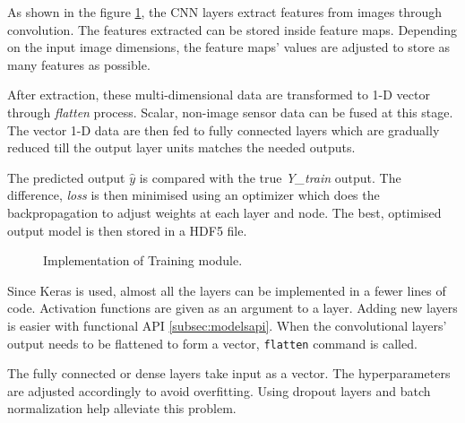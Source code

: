 As shown in the figure \ref{fig:trainingmodule}, the CNN layers extract features from
images through convolution. The features extracted can be stored inside feature maps. Depending on the input image dimensions, the
feature maps' values are adjusted to store as many features as possible.

After extraction, these multi-dimensional data are transformed to 1-D vector through
\textit{flatten} process. Scalar, non-image sensor data can be fused at this stage. The
vector 1-D data are then fed to fully connected layers which are gradually reduced till
the output layer units matches the needed outputs.

The predicted output $\hat{y}$ is compared with the true \textit{Y\_train} output. The
difference, \textit{loss} is then minimised using an optimizer which does the
backpropagation to adjust weights at each layer and node. The best, optimised output model
is then stored in a HDF5 file.
\iffalse
For CNN layers, feature maps starting from 24 channels is chosen and gradually increased till 64.
The stride is always kept at 2 whereas the kernel size is (5,5) for the early and
(3,3) for the later stages. For early data fusion, the input is already fused and directly
fed to the neural network. However, for late fusion, concatenation is done at appropriate
stages. If necessary, max pooling and batch normalization layers are added to the neural
network. Most often to distribute the features uniformly and to make the cost function
distribute symmetrically, the inputs are normalized. In this case, since images are pixel
values between 0-255, each pixel is divided by 255 to bring it in the range between 0 and
1.
\fi
\begin{figure}[!ht]
    \centering
        \def\svgwidth{\textwidth}
    \caption{Implementation of Training module.}
    \label{fig:trainingmodule}
\end{figure}
\iffalse
Since Keras is used, almost all the layers can be implemented in a fewer lines of code.
Activation functions are given as an argument to a layer. Adding new layers is easier with
functional API \ref{subsec:modelsapi}. When the convolutional layers' output needs to be
flattened to form a vector, \texttt{flatten} command is called.

The fully connected or dense layers take input as a vector. The hyperparameters are
adjusted accordingly to avoid overfitting. Using dropout layers and batch normalization
help alleviate this problem.

